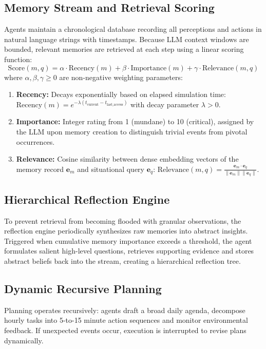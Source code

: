 \documentclass[12pt,a4paper]{report}
\begin{document}
\subsection{Memory Stream and Retrieval Scoring}
Agents maintain a chronological database recording all perceptions and actions in natural language strings with timestamps. Because LLM context windows are bounded, relevant memories are retrieved at each step using a linear scoring function:
\begin{equation}
\text{Score}(m, q) = \alpha \cdot \text{Recency}(m) + \beta \cdot \text{Importance}(m) + \gamma \cdot \text{Relevance}(m, q)
\end{equation}
where $\alpha, \beta, \gamma \ge 0$ are non-negative weighting parameters:
\begin{enumerate}[label=\arabic*., itemsep=1pt, parsep=0pt, topsep=2pt]
    \item \textbf{Recency:} Decays exponentially based on elapsed simulation time: $\text{Recency}(m) = e^{-\lambda (t_{\text{current}} - t_{\text{last\_access}})}$ with decay parameter $\lambda > 0$.
    \item \textbf{Importance:} Integer rating from 1 (mundane) to 10 (critical), assigned by the LLM upon memory creation to distinguish trivial events from pivotal occurrences.
    \item \textbf{Relevance:} Cosine similarity between dense embedding vectors of the memory record $\mathbf{e}_m$ and situational query $\mathbf{e}_q$: $\text{Relevance}(m, q) = \frac{\mathbf{e}_m \cdot \mathbf{e}_q}{\|\mathbf{e}_m\| \|\mathbf{e}_q\|}$.
\end{enumerate}

\subsection{Hierarchical Reflection Engine}
To prevent retrieval from becoming flooded with granular observations, the reflection engine periodically synthesizes raw memories into abstract insights. Triggered when cumulative memory importance exceeds a threshold, the agent formulates salient high-level questions, retrieves supporting evidence and stores abstract beliefs back into the stream, creating a hierarchical reflection tree.

\subsection{Dynamic Recursive Planning}
Planning operates recursively: agents draft a broad daily agenda, decompose hourly tasks into 5-to-15 minute action sequences and monitor environmental feedback. If unexpected events occur, execution is interrupted to revise plans dynamically.
\end{document}
